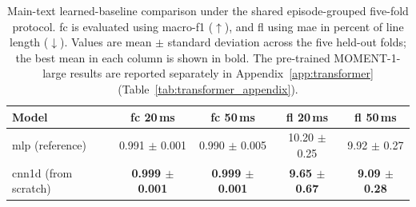 \begin{table}[pos=t]
\caption{Main-text learned-baseline comparison under the shared episode-grouped five-fold protocol. \Ac{fc} is evaluated using macro-\ac{f1} ($\uparrow$), and \ac{fl} using \ac{mae} in percent of line length ($\downarrow$). Values are mean $\pm$ standard deviation across the five held-out folds; the best mean in each column is shown in bold. The pre-trained MOMENT-1-large results are reported separately in Appendix~\ref{app:transformer} (Table~\ref{tab:transformer_appendix}).}
\label{tab:transformer_summary}
\small
\centering
\begin{tabular}{lcccc}
\toprule
\textbf{Model} & \textbf{\ac{fc} 20\,ms} & \textbf{\ac{fc} 50\,ms} & \textbf{\ac{fl} 20\,ms} & \textbf{\ac{fl} 50\,ms} \\
\midrule
\ac{mlp} (reference)       & 0.991 $\pm$ 0.001 & 0.990 $\pm$ 0.005 & 10.20 $\pm$ 0.25 & \phantom{0}9.92 $\pm$ 0.27 \\
\ac{cnn1d} (from scratch)  & \textbf{0.999 $\pm$ 0.001} & \textbf{0.999 $\pm$ 0.001} & \textbf{\phantom{0}9.65 $\pm$ 0.67} & \textbf{\phantom{0}9.09 $\pm$ 0.28} \\
\bottomrule
\end{tabular}
\end{table}
